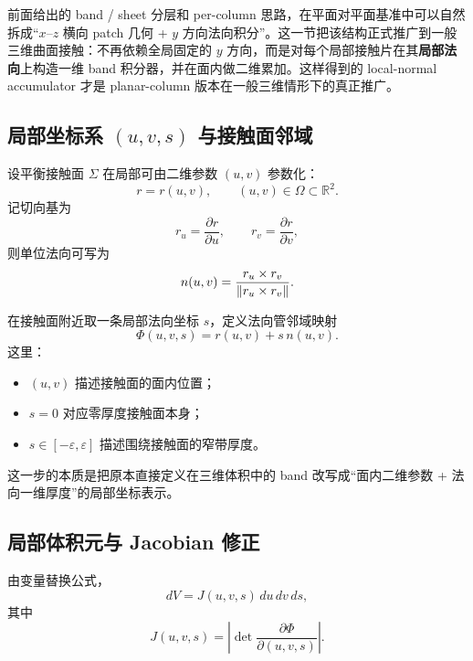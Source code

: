 \documentclass[12pt,a4paper]{ctexart}
\begin{document}
前面给出的 band / sheet 分层和 per-column 思路，在平面对平面基准中可以自然拆成“$x$--$z$ 横向 patch 几何 + $y$ 方向法向积分”。这一节把该结构正式推广到一般三维曲面接触：不再依赖全局固定的 $y$ 方向，而是对每个局部接触片在其\textbf{局部法向}上构造一维 band 积分器，并在面内做二维累加。这样得到的 local-normal accumulator 才是 planar-column 版本在一般三维情形下的真正推广。

\subsection{局部坐标系 $(u,v,s)$ 与接触面邻域}

设平衡接触面 $\Sigma$ 在局部可由二维参数 $(u,v)$ 参数化：
\begin{equation}
    r=r(u,v), \qquad (u,v)\in\Omega\subset\mathbb R^2.
\end{equation}
记切向基为
\begin{equation}
    r_u=\frac{\partial r}{\partial u}, \qquad r_v=\frac{\partial r}{\partial v},
\end{equation}
则单位法向可写为
\begin{equation}
    n(u,v)=\frac{r_u\times r_v}{\norm{r_u\times r_v}}.
\end{equation}

在接触面附近取一条局部法向坐标 $s$，定义法向管邻域映射
\begin{equation}
    \Phi(u,v,s)=r(u,v)+s\,n(u,v).
\end{equation}
这里：
\begin{itemize}
    \item $(u,v)$ 描述接触面的面内位置；
    \item $s=0$ 对应零厚度接触面本身；
    \item $s\in[-\varepsilon,\varepsilon]$ 描述围绕接触面的窄带厚度。
\end{itemize}

这一步的本质是把原本直接定义在三维体积中的 band 改写成“面内二维参数 + 法向一维厚度”的局部坐标表示。

\subsection{局部体积元与 Jacobian 修正}

由变量替换公式，
\begin{equation}
    dV = J(u,v,s)\,du\,dv\,ds,
\end{equation}
其中
\begin{equation}
    J(u,v,s)=\left|\det\frac{\partial \Phi}{\partial(u,v,s)}\right|.
\end{equation}
\end{document}
